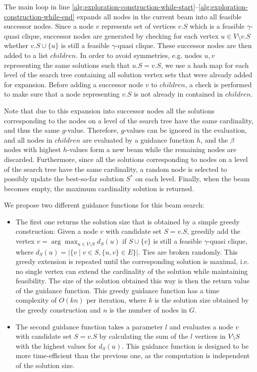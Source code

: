 \documentclass[draft,final]{vutinfth} %
\begin{document}
The main loop in line \ref{alg:exploration-construction-while-start}--\ref{alg:exploration-construction-while-end} expands all nodes in the current beam into all feasible successor nodes. 
Since a node $v$ represents set of vertices $\mathit{v.S}$ which is a feasible $\gamma$-quasi clique, successor nodes are generated by checking for each vertex $u \in V \setminus \mathit{v.S}$ whether $\mathit{v.S} \cup \{u\}$ is still a feasible $\gamma$-quasi clique. 
These successor nodes are then added to a list $\mathit{children}$. 
In order to avoid symmetries, e.g. nodes $u,v$ representing the same solutions such that $u.S = v.S$, we use a hash map for each level of the search tree containing all solution vertex sets that were already added for expansion. Before adding a successor node $v$ to $\mathit{children}$, a check is performed to make sure that a node representing $v.S$ is not already in contained in $\mathit{children}$.  

Note that due to this expansion into successor nodes all the solutions corresponding to the nodes on a level of the search tree have the same cardinality, and thus the same $g$-value.  
Therefore, $g$-values can be ignored in the evaluation, and all nodes in $\mathit{children}$ are evaluated by a guidance function $h$, and the $\beta$ nodes with highest $h$-values form a new beam while the remaining nodes are discarded. 
Furthermore, since all the solutions corresponding to nodes on a level of the search tree have the same cardinality, a random node is selected to possibly update the best-so-far solution $S^*$ on each level.
Finally, when the beam becomes empty, the maximum cardinality solution is returned. 

We propose two different guidance functions for this beam search: 
\begin{itemize}
    \item The first one returns the solution size that is obtained by a simple greedy construction: Given a node $v$ with candidate set $S = v.S$, greedily add the vertex $v = \arg \max_{u \in V \setminus S} d_S(u)$ if $S \cup \{v\}$ is still a feasible $\gamma$-quasi clique, where $d_S(u) = |\{v \mid v \in S, \{u,v\} \in E \}|$. 
    Ties are broken randomly. This greedy extension is repeated until the corresponding solution is maximal, i.e. no single vertex can extend the cardinality of the solution while maintaining feasibility. 
    The size of the solution obtained this way is then the return value of the guidance function. This greedy guidance function has a time complexity of $O(kn)$ per iteration, where $k$ is the solution size obtained by the greedy construction and $n$ is the number of nodes in $G$. 
    \item The second guidance function takes a parameter $l$ and evaluates a node $v$ with candidate set $S = v.S$ by calculating the sum of the $l$ vertices in $V \setminus S$ with the highest values for $d_S(u)$. This guidance function is designed to be more time-efficient than the previous one, as the computation is independent of the solution size. 
\end{itemize}
\end{document}
